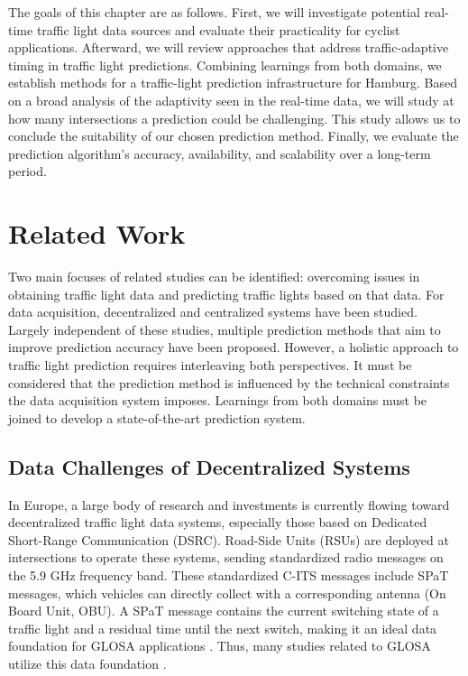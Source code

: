 The goals of this chapter are as follows. First, we will investigate potential real-time traffic light data sources and evaluate their practicality for cyclist applications. Afterward, we will review approaches that address traffic-adaptive timing in traffic light predictions. Combining learnings from both domains, we establish methods for a traffic-light prediction infrastructure for Hamburg. Based on a broad analysis of the adaptivity seen in the real-time data, we will study at how many intersections a prediction could be challenging. This study allows us to conclude the suitability of our chosen prediction method. Finally, we evaluate the prediction algorithm's accuracy, availability, and scalability over a long-term period.

\section{Related Work}

Two main focuses of related studies can be identified: overcoming issues in obtaining traffic light data and predicting traffic lights based on that data. For data acquisition, decentralized and centralized systems have been studied. Largely independent of these studies, multiple prediction methods that aim to improve prediction accuracy have been proposed. However, a holistic approach to traffic light prediction requires interleaving both perspectives. It must be considered that the prediction method is influenced by the technical constraints the data acquisition system imposes. Learnings from both domains must be joined to develop a state-of-the-art prediction system.

\subsection{Data Challenges of Decentralized Systems}

In Europe, a large body of research and investments is currently flowing toward decentralized traffic light data systems, especially those based on Dedicated Short-Range Communication (DSRC). Road-Side Units (RSUs) are deployed at intersections to operate these systems, sending standardized radio messages on the 5.9 GHz frequency band. These standardized C-ITS messages include SPaT messages, which vehicles can directly collect with a corresponding antenna (On Board Unit, OBU). A SPaT message contains the current switching state of a traffic light and a residual time until the next switch, making it an ideal data foundation for GLOSA applications \cite{ibrahim_estimating_2019}. Thus, many studies related to GLOSA utilize this data foundation \cite{schweiger_elisatm_2011, rakha_eco-driving_2011, rakha_aeris_2012, li_open_2012, suramardhana_driver-centric_2014, xu_bb_2015, bernais_design_2016, nguyen_efficient_2016, choudhury_integrated_2016, stahlmann_multi-hop_2017, stahlmann_exploring_2018, plianos_predictive_2018, zhang_green_2020, chen_developing_2022}.

